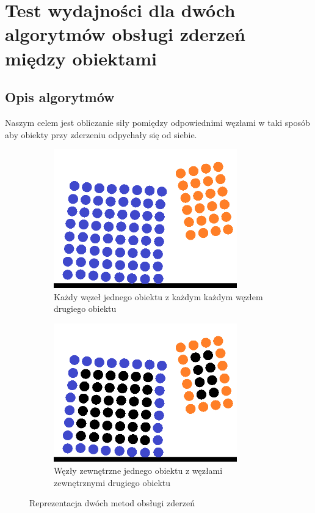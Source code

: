 \documentclass[12pt, letterpaper]{report}
\begin{document}
    \section{Test wydajności dla dwóch algorytmów obsługi zderzeń między obiektami}
    \subsection{Opis algorytmów}
    Naszym celem jest obliczanie siły pomiędzy odpowiednimi węzłami w taki sposób aby 
    obiekty przy zderzeniu odpychały się od siebie.
    
    \begin{figure}[h]
        \centering
        \begin{subfigure}[t]{0.45\textwidth}
            \includegraphics[width=\textwidth, height=6cm]{objects_unoptimized} 
            \caption{Każdy węzeł jednego obiektu z każdym każdym węzłem drugiego obiektu}
        \end{subfigure}
        \begin{subfigure}[t]{0.45\textwidth}
            \includegraphics[width=\textwidth, height=6cm]{objects_optimized}
            \caption{Węzły zewnętrzne jednego obiektu z węzłami zewnętrznymi drugiego obiektu}
        \end{subfigure}
        \caption{Reprezentacja dwóch metod obsługi zderzeń}
    \end{figure}
\end{document}
